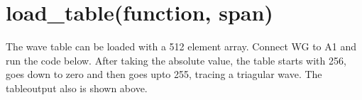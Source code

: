 \documentclass[a4paper,12pt,english]{sphinxmanual}
\begin{document}
\begin{sphinxVerbatim}[commandchars=\\\{\}]
   

 
       

 \PYG{p}{[}\PYG{p}{]}
   
\end{sphinxVerbatim}


\section{load\_table(function, span)}
\label{\detokenize{9.0:load-table-function-span}}
The wave table can be loaded with a 512 element array. Connect WG to A1
and run the code below. After taking the absolute value, the table
starts with 256, goes down to zero and then goes upto 255, tracing a
triagular wave. The tableoutput also is shown above.

\begin{sphinxVerbatim}[commandchars=\\\{\}]
   
   
  
   
\end{sphinxVerbatim}



\renewcommand{\indexname}{Index}
\printindex
\end{document}
